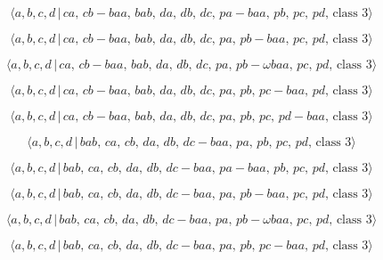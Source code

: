 \documentclass[10pt]{article}
\begin{document}
\begin{equation}
\langle
a,b,c,d\,|\,ca,\,cb-baa,\,bab,\,da,\,db,\,dc,\,pa-baa,\,pb,\,pc,\,pd,\,\text{
class }3\rangle  \tag{6.73}
\end{equation}

\begin{equation}
\langle
a,b,c,d\,|\,ca,\,cb-baa,\,bab,\,da,\,db,\,dc,\,pa,\,pb-baa,\,pc,\,pd,\,\text{
class }3\rangle  \tag{6.74}
\end{equation}

\begin{equation}
\langle a,b,c,d\,|\,ca,\,cb-baa,\,bab,\,da,\,db,\,dc,\,pa,\,pb-\omega
baa,\,pc,\,pd,\,\text{class }3\rangle  \tag{6.75}
\end{equation}

\begin{equation}
\langle
a,b,c,d\,|\,ca,\,cb-baa,\,bab,\,da,\,db,\,dc,\,pa,\,pb,\,pc-baa,\,pd,\,\text{
class }3\rangle  \tag{6.76}
\end{equation}

\begin{equation}
\langle
a,b,c,d\,|\,ca,\,cb-baa,\,bab,\,da,\,db,\,dc,\,pa,\,pb,\,pc,\,pd-baa,\,\text{
class }3\rangle  \tag{6.77}
\end{equation}

\begin{equation}
\langle a,b,c,d\,|\,bab,\,ca,\,cb,\,da,\,db,\,dc-baa,\,pa,\,pb,\,pc,\,pd,\,%
\text{class }3\rangle  \tag{6.78}
\end{equation}

\begin{equation}
\langle
a,b,c,d\,|\,bab,\,ca,\,cb,\,da,\,db,\,dc-baa,\,pa-baa,\,pb,\,pc,\,pd,\,\text{
class }3\rangle  \tag{6.79}
\end{equation}

\begin{equation}
\langle
a,b,c,d\,|\,bab,\,ca,\,cb,\,da,\,db,\,dc-baa,\,pa,\,pb-baa,\,pc,\,pd,\,\text{
class }3\rangle  \tag{6.80}
\end{equation}

\begin{equation}
\langle a,b,c,d\,|\,bab,\,ca,\,cb,\,da,\,db,\,dc-baa,\,pa,\,pb-\omega
baa,\,pc,\,pd,\,\text{class }3\rangle  \tag{6.81}
\end{equation}

\begin{equation}
\langle
a,b,c,d\,|\,bab,\,ca,\,cb,\,da,\,db,\,dc-baa,\,pa,\,pb,\,pc-baa,\,pd,\,\text{
class }3\rangle  \tag{6.82}
\end{equation}
\end{document}

